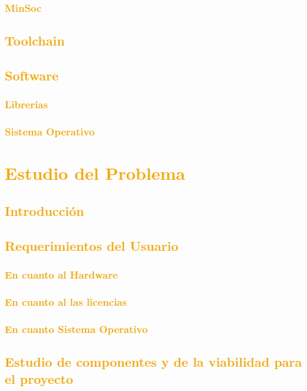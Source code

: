 \documentclass[a4paper,11pt]{article}
\begin{document}
			\subsubsection{\textcolor{orange}{MinSoc}}
		\subsection{\textcolor{orange}{Toolchain}}
		\subsection{\textcolor{orange}{Software}}
			\subsubsection{\textcolor{orange}{Librerías}}
			\subsubsection{\textcolor{orange}{Sistema Operativo}}
			
	
\section{\textcolor{orange}{Estudio del Problema}}
	\subsection{\textcolor{orange}{Introducción}}
	\subsection{\textcolor{orange}{Requerimientos del Usuario}}
			\subsubsection{\textcolor{orange}{En cuanto al Hardware}}
			\subsubsection{\textcolor{orange}{En cuanto al las licencias}} 
			\subsubsection{\textcolor{orange}{En cuanto Sistema Operativo}} 	 
				 		\subsection{\textcolor{orange}{Estudio de componentes y de la viabilidad para el proyecto}}	
\end{document}

